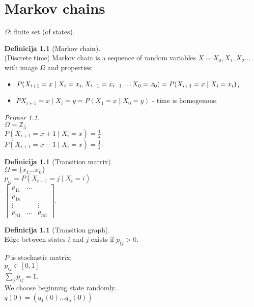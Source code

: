 \documentclass[a4paper, 12pt]{book}
\theoremstyle{definition}
\newtheorem{defn}[counter]{Definicija}
\theoremstyle{remark}
\newtheorem*{ex}{Primer}
\newcommand{\Z}{\mathbb{Z}}
\begin{document}
\chapter{Markov chains}


$\Omega$: finite set (of states).
\begin{defn}[Markov chain] \text{} \\
  (Discrete time) Markov chain is a sequence of random variables $X = X_0, X_1, X_2 \dots$ with image $\Omega$ and properties:
  \begin{itemize}
    \item $P(X_{i+1} = x \mid X_i = x_i, X_{i-1} = x_{i-1} \dots X_0 = x_0) =\\ P(X_{i+1} = x \mid X_i = x_i)$,
    \item $P{X_{i+1} = x \mid X_i = y} = P(X_1 = x \mid X_0 = y)$ - time is homogenous.
  \end{itemize}
\end{defn}
\begin{ex} \text{} \\
  $\Omega = \Z_5$ \\
  $P(X_{i+1} = x+1 \mid X_i = x) = \frac{1}{2}$ \\
  $P(X_{i+1} = x-1 \mid X_i = x) = \frac{1}{2}$. \\
\end{ex}
\begin{defn}[Transition matrix] \text{} \\
  $\Omega = \{x_1 \dots x_n\}$ \\
  $p_{ij} = P(X_{t+1} = j \mid X_t = i)$ \\
  $\begin{bmatrix}
    p_{11} & \dots \\ p_{1n} \\
    \vdots & & \vdots \\
    p_{n1} & \dots & p_{nn}
  \end{bmatrix}$.
\end{defn}
\begin{defn}[Transition graph] \text{} \\ 
  Edge between states $i$ and $j$ exists if $p_{ij} > 0$.
\end{defn}
$P$ is stochastic matrix: \\
$p_{ij} \in [0,1]$ \\
$\sum_j p_{ij} = 1$. \\
We choose beginning state randomly. \\
$q(0) = (q_1(0) \dots q_n(0))$ \\
\end{document}
